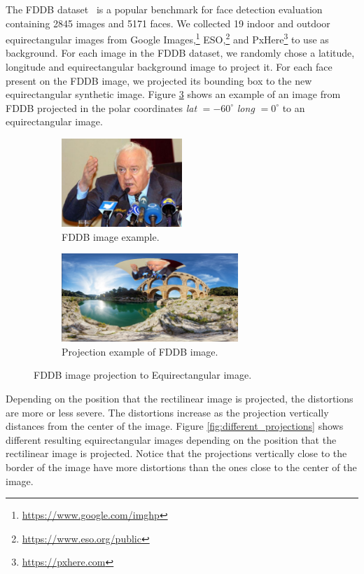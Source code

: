 The FDDB dataset~\cite{jain2010fddb} is a popular benchmark for face detection evaluation containing 2845 images and 5171 faces. We collected 19 indoor and outdoor equirectangular images from Google Images,\footnote{\url{https://www.google.com/imghp}} ESO,\footnote{\url{https://www.eso.org/public}} and PxHere\footnote{\url{https://pxhere.com}} to use as background.
For each image in the FDDB dataset, we randomly chose a latitude, longitude and equirectangular background image to project it.
For each face present on the FDDB image, we projected its bounding box to the new equirectangular synthetic image. Figure \ref{fig:authoring_fddb_proj} shows an example of an image from FDDB projected in the polar coordinates \emph{lat} $ = -60^{\circ}$ \emph{long} $ = 0^{\circ}$ to an equirectangular image.

\begin{figure}[!ht]
\centering
    \begin{subfigure}{0.4\linewidth}
        \centering
        \includegraphics[height=9em]{img/video360/face_pre.png}
        \caption{FDDB image example.}
        \label{subfig:face_pre}
    \end{subfigure}\hfill
    \begin{subfigure}{0.55\linewidth}
        \centering
         \includegraphics[height=9em]{img/video360/face_pos.png}
        \caption{Projection example of FDDB image.}
        \label{subfig:face_pos}
    \end{subfigure}

\caption{FDDB image projection to Equirectangular image.}
\label{fig:authoring_fddb_proj}
\end{figure}

Depending on the position that the rectilinear image is projected, the distortions are more or less severe. The distortions increase as the projection vertically distances from the center of the image. Figure \ref{fig:different_projections} shows different resulting equirectangular images depending on the position that the rectilinear image is projected. Notice that the projections vertically close to the border of the image have more distortions than the ones close to the center of the image.

